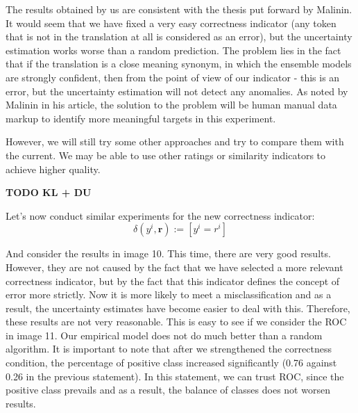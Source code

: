 \documentclass[a4paper,14pt]{extarticle}
\begin{document}
	The results obtained by us are consistent with the thesis put forward by Malinin. It would seem that we have fixed a very easy correctness indicator (any token that is not in the translation at all is considered as an error), but the uncertainty estimation works worse than a random prediction. The problem lies in the fact that if the translation is a close meaning synonym, in which the ensemble models are strongly confident, then from the point of view of our indicator - this is an error, but the uncertainty estimation will not detect any anomalies. As noted by Malinin in his article, the solution to the problem will be human manual data markup to identify more meaningful targets in this experiment.

	However, we will still try some other approaches and try to compare them with the current. We may be able to use other ratings or similarity indicators to achieve higher quality.
	
	\textbf{TODO KL + DU}
	
	Let's now conduct similar experiments for the new correctness indicator:
	\begin{equation}
		\delta(y^i, \textbf{r}) := [y^i = r^i]
	\end{equation}
	
		
	\begin{figure}[t]
	\end{figure}	
	And consider the results in image 10. This time, there are very good results. However, they are not caused by the fact that we have selected a more relevant correctness indicator, but by the fact that this indicator defines the concept of error more strictly. Now it is more likely to meet a misclassification and as a result, the uncertainty estimates have become easier to deal with this. Therefore, these results are not very reasonable. This is easy to see if we consider the ROC in image 11. Our empirical model does not do much better than a random algorithm. It is important to note that after we strengthened the correctness condition, the percentage of positive class increased significantly (0.76 against 0.26 in the previous statement). In this statement, we can trust ROC, since the positive class prevails and as a result, the balance of classes does not worsen results.
	
\end{document}
